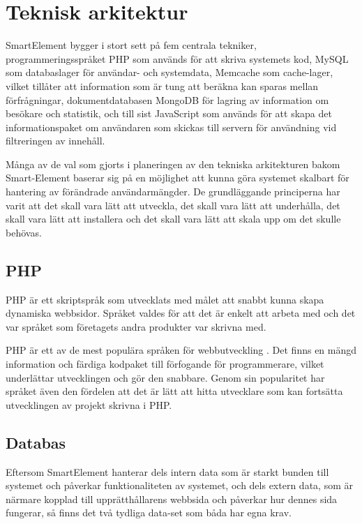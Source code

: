 \section{Teknisk arkitektur}

SmartElement bygger i stort sett på fem centrala tekniker, programmeringsspråket PHP som används för att skriva systemets kod, MySQL som databaslager för användar- och systemdata, Memcache som cache-lager, vilket tillåter att information som är tung att beräkna kan sparas mellan förfrågningar, dokumentdatabasen MongoDB för lagring av information om besökare och statistik, och till sist JavaScript som används för att skapa det informationspaket om användaren som skickas till servern för användning vid filtreringen av innehåll.

Många av de val som gjorts i planeringen av den tekniska arkitekturen bakom Smart-Element baserar sig på en möjlighet att kunna göra systemet skalbart för hantering av förändrade användarmängder. De grundläggande principerna har varit att det skall vara lätt att utveckla, det skall vara lätt att underhålla, det skall vara lätt att installera och det skall vara lätt att skala upp om det skulle behövas.

\subsection{PHP}

PHP är ett skriptspråk som utvecklats med målet att snabbt kunna skapa dynamiska webbsidor. \citep{phpmanual} Språket valdes för att det är enkelt att arbeta med och det var språket som företagets andra produkter var skrivna med.

PHP är ett av de mest populära språken för webbutveckling \citep{tiobe}. Det finns en mängd information och färdiga kodpaket till förfogande för programmerare, vilket underlättar utvecklingen och gör den snabbare. Genom sin popularitet har språket även den fördelen att det är lätt att hitta utvecklare som kan fortsätta utvecklingen av projekt skrivna i PHP.

\subsection{Databas}

Eftersom SmartElement hanterar dels intern data som är starkt bunden till systemet och påverkar funktionaliteten av systemet, och dels extern data, som är närmare kopplad till upprätthållarens webbsida och påverkar hur dennes sida fungerar, så finns det två tydliga data-set som båda har egna krav.

